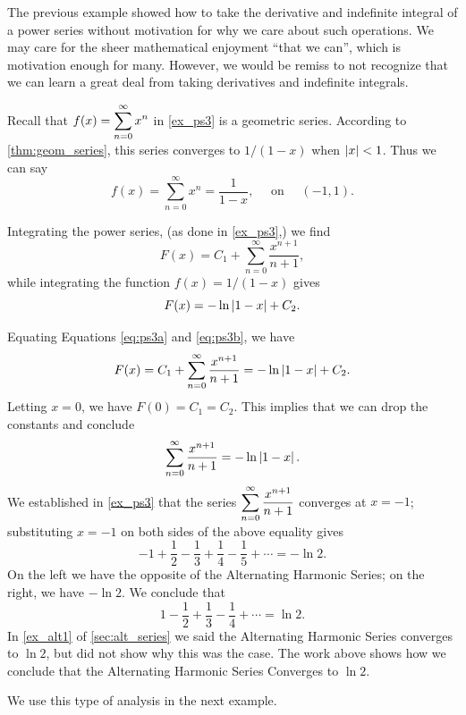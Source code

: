 The previous example showed how to take the derivative and indefinite integral of a power series without motivation for why we care about such operations. We may care for the sheer mathematical enjoyment ``that we can'', which is motivation enough for many. However, we would be remiss to not recognize that we can learn a great deal from taking derivatives and indefinite integrals.\bigskip

Recall that $\displaystyle f(x) = \sum_{n=0}^\infty x^n$ in \autoref{ex_ps3} is a geometric series. According to \autoref{thm:geom_series}, this series converges to $1/(1-x)$ when $\left\lvert x \right\rvert<1$. Thus we can say
\begin{equation}
f(x) = \sum_{n=0}^\infty x^n = \frac 1{1-x},\quad \text{ on }\quad (-1,1).
\label{eq:power_series_geometric}
\end{equation}

Integrating the power series, (as done in \autoref{ex_ps3},) we find
\begin{equation}
F(x)  = C_1+\sum_{n=0}^\infty \frac{x^{n+1}}{n+1},\label{eq:ps3a}
\end{equation}
while integrating the function $f(x) = 1/(1-x)$ gives
\begin{equation}
F(x)  = -\ln\left\lvert 1-x \right\rvert + C_2.\label{eq:ps3b}
\end{equation}

Equating Equations \eqref{eq:ps3a} and \eqref{eq:ps3b}, we have 
\[F(x) = C_1+\sum_{n=0}^\infty \frac{x^{n+1}}{n+1} = -\ln\left\lvert 1-x \right\rvert + C_2.\]
Letting $x=0$, we have $F(0) = C_1 = C_2$. This implies that we can drop the constants and conclude
\[\sum_{n=0}^\infty \frac{x^{n+1}}{n+1} = -\ln\left\lvert 1-x \right\rvert.\]
We established in \autoref{ex_ps3} that the series $\displaystyle\sum_{n=0}^\infty \frac{x^{n+1}}{n+1}$ converges at $x=-1$; substituting $x=-1$ on both sides of the above equality gives
\[-1+\frac12-\frac13+\frac14-\frac15+\dotsb = -\ln 2.\]
On the left we have the opposite of the Alternating Harmonic Series; on the right, we have $-\ln 2$. We conclude that 
\[1-\frac12+\frac13-\frac14+\dotsb = \ln 2.\]
In \autoref{ex_alt1} of \autoref{sec:alt_series} we said the Alternating Harmonic Series converges to $\ln 2$, but did not show why this was the case. The work above shows how we conclude that the Alternating Harmonic Series Converges to $\ln 2$. 

We use this type of analysis in the next example.

